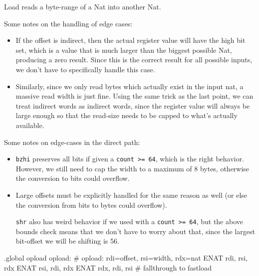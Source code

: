 Load reads a byte-range of a Nat into another Nat.

Some notes on the handling of edge cases:

\begin{itemize}
\item
   If the offset is indirect, then the actual register value will have
   the high bit set, which is a value that is much larger than the biggest
   possible Nat, producing a zero result.  Since this is the correct
   result for all possible inputs, we don't have to specifically handle
   this case.
\item
   Similarly, since we only read bytes which actually exist in the input
   nat, a massive read width is just fine.  Using the same trick as the
   last point, we can treat indirect words as indirect words, since the
   register value will always be large enough so that the read-size
   needs to be capped to what's actually available.
\end{itemize}

Some notes on edge-cases in the direct path:

\begin{itemize}
\item
   \lstinline|bzhi| preserves all bits if given a
   \lstinline|count >= 64|, which is the right behavior.  However,
   we still need to cap the width to a maximum of 8 bytes, otherwise
   the conversion to bits could overflow.
\item
    Large offsets must be explicitly handled for the same reason as well
    (or else the conversion from bits to bytes could overflow).

    \lstinline|shr| also has weird behavior if we used with a
    \lstinline|count >= 64|, but the above bounds check means that we
    don't have to worry about that, since the largest bit-offset we will
    be shifting is 56.
\end{itemize}

\begin{asm}
.global opload
opload:				# opload: rdi=offset, rsi=width, rdx=nat
	ENAT	rdi, rsi, rdx
	ENAT	rsi, rdi, rdx
	ENAT	rdx, rdi, rsi
	# fallthrough to fastload
\end{asm}

